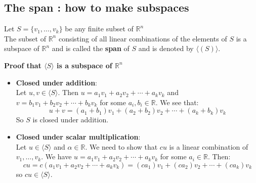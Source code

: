 \documentclass[a4paper, 9pt]{extarticle}
\begin{document}
\subsection{The span : how to make subspaces}
\begin{definitionbox}{}{}
  Let $S = \{v_1, \dots, v_k\}$ be any finite subset of $\mathbb{R}^n$ \\[2ex]

  The subset of $\mathbb{R}^n$ consisting of all linear combinations of the elements of $S$ is a subspace of $\mathbb{R}^n$ and is called the \textbf{span} of $S$ and is denoted by $\langle (S) \rangle$.
\end{definitionbox}
\noindent \textbf{Proof that $\langle S \rangle$ is a subspace of $\mathbb{R}^n$}
\begin{itemize}
  \item  \textbf{Closed under addition}: \\
        Let $u, v \in \langle S \rangle$. Then $u = a_1v_1 + a_2v_2 + \cdots + a_kv_k$ and $v = b_1v_1 + b_2v_2 + \cdots + b_kv_k$ for some $a_i, b_i \in \mathbb{R}$. We see that:
        $$u + v = (a_1 + b_1)v_1 + (a_2 + b_2)v_2 + \cdots + (a_k + b_k)v_k$$
        So $S$ is closed under addition.
  \item \textbf{Closed under scalar multiplication}: \\
        Let $u \in \langle S \rangle$ and $\alpha \in \mathbb{R}$. We need to show that $cu$ is a linear combination of $v_1, \dots, v_k$. We have $u = a_1v_1 + a_2v_2 + \cdots + a_kv_k$ for some $a_i \in \mathbb{R}$. Then:
        $$cu = c(a_1v_1 + a_2v_2 + \cdots + a_kv_k) = (ca_1)v_1 + (ca_2)v_2 + \cdots + (ca_k)v_k$$
        so $cu \in \langle S \rangle$.
\end{itemize}
\end{document}

